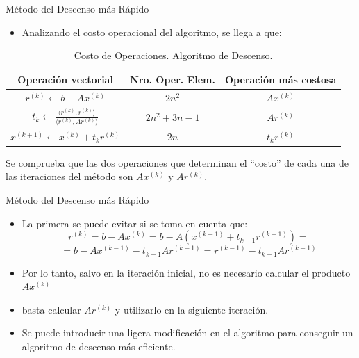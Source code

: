 \documentclass[10pt]{beamer}
\begin{document}
\begin{frame}{M\'etodo del Descenso m\'as R\'apido}
  \begin{itemize}
    \item<1->Analizando el costo operacional del algoritmo, se llega a que: 
  \end{itemize}
  \begin{table}[ht]
    \begin{center}
     \begin{tabular}{|c|c|c|}\hline
     Operaci\'on vectorial & Nro. Oper. Elem. & Operaci\'on m\'as costosa\\\hline
     $r^{(k)} \leftarrow b-Ax^{(k)}$ & $2n^2$ & $Ax^{(k)}$\\[5pt]
    $t_k \leftarrow \displaystyle\frac{\langle r^{(k)},r^{(k)}\rangle}{\langle r^{(k)},Ar^{(k)}\rangle}$ & $2n^2+3n-1 $ & $Ar^{(k)}$\\[10pt]
    $x^{(k+1)} \leftarrow x^{(k)}+t_kr^{(k)}$ & $2n$ & $t_kr^{(k)}$\\\hline
    \end{tabular}
    \caption{Costo de Operaciones. Algoritmo de Descenso.}
    \end{center}
    \end{table}
    Se comprueba que las dos operaciones que determinan el ``costo'' de cada una de
las iteraciones del m\'etodo son $Ax^{(k)}$ y $Ar^{(k)}$.
\end{frame}
\begin{frame}{M\'etodo del Descenso m\'as R\'apido}
  \begin{itemize}
    \item<1->La primera se puede evitar si se toma en cuenta que:
    $$
     r^{(k)} = b - Ax^{(k)} = b- A(x^{(k-1)}+t_{k-1}r^{(k-1)}) = 
     $$
     $$
     =b - Ax^{(k-1)} - t_{k-1}Ar^{(k-1)} = r^{(k-1)} - t_{k-1}Ar^{(k-1)}
    $$
    \item<2->Por lo tanto, salvo en la iteraci\'on inicial, no es necesario calcular el producto $Ax^{(k)}$
    \item<3->basta calcular $Ar^{(k)}$ y utilizarlo en la siguiente iteraci\'on.
    \item <4->Se puede introducir una ligera modificaci\'on en el algoritmo para conseguir un algoritmo de descenso m\'as eficiente.
  \end{itemize}
\end{frame}
\end{document}
